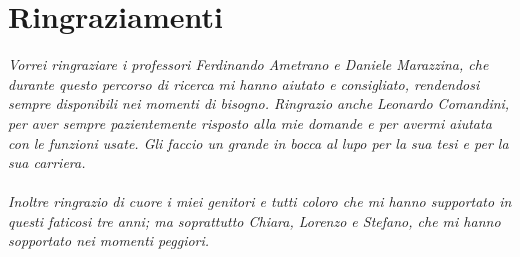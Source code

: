 \chapter*{Ringraziamenti}
\pagestyle{empty} \normalfont 

\textit{Vorrei ringraziare i professori Ferdinando Ametrano e Daniele Marazzina, che durante questo percorso di ricerca mi hanno aiutato e consigliato, rendendosi sempre disponibili nei momenti di bisogno. Ringrazio anche Leonardo Comandini, per aver sempre pazientemente risposto alla mie domande e per avermi aiutata con le funzioni usate. Gli faccio un grande in bocca al lupo per la sua tesi e per la sua carriera. 
\\
\\
Inoltre ringrazio di cuore i miei genitori e tutti coloro che mi hanno supportato in questi faticosi tre anni; ma soprattutto Chiara, Lorenzo e Stefano, che mi hanno sopportato nei momenti peggiori.}
